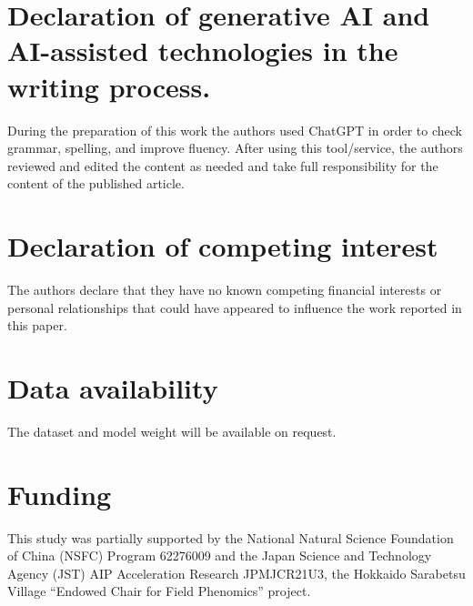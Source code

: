 \documentclass[12pt]{article}
\begin{document}
\section*{Declaration of generative AI and AI-assisted technologies in the writing process.}
During the preparation of this work the authors used ChatGPT in order to check grammar, spelling, and improve fluency. After using this tool/service, the authors reviewed and edited the content as needed and take full responsibility for the content of the published article.

\section*{Declaration of competing interest}
The authors declare that they have no known competing financial interests or personal relationships that could have appeared to influence the work reported in this paper.

\section*{Data availability}
The dataset and model weight will be available on request.

\section*{Funding}
This study was partially supported by the National Natural Science Foundation of China (NSFC) Program 62276009 and the Japan Science and Technology Agency (JST) AIP Acceleration Research JPMJCR21U3, the Hokkaido Sarabetsu Village “Endowed Chair for Field Phenomics” project.


{\clearpage}



\end{document}

